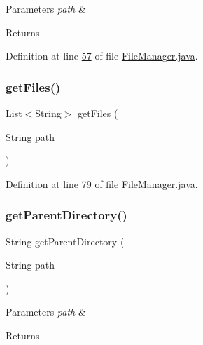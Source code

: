 \begin{DoxyParams}{Parameters}
{\em path} & \\
\hline
\end{DoxyParams}
\begin{DoxyReturn}{Returns}

\end{DoxyReturn}


Definition at line \hyperlink{_file_manager_8java_source_l00057}{57} of file \hyperlink{_file_manager_8java_source}{File\+Manager.\+java}.

\hypertarget{classfunctions_1_1_file_manager_a3a54a5574abfddd928b2b8675e8affa6}{}\label{classfunctions_1_1_file_manager_a3a54a5574abfddd928b2b8675e8affa6} 
\subsubsection{\texorpdfstring{get\+Files()}{getFiles()}}
{\footnotesize\ttfamily List$<$String$>$ get\+Files (\begin{DoxyParamCaption}\item[{String}]{path }\end{DoxyParamCaption})}



Definition at line \hyperlink{_file_manager_8java_source_l00079}{79} of file \hyperlink{_file_manager_8java_source}{File\+Manager.\+java}.

\hypertarget{classfunctions_1_1_file_manager_aa9e15d838c5a7a0e3906d9ceec253398}{}\label{classfunctions_1_1_file_manager_aa9e15d838c5a7a0e3906d9ceec253398} 
\subsubsection{\texorpdfstring{get\+Parent\+Directory()}{getParentDirectory()}}
{\footnotesize\ttfamily String get\+Parent\+Directory (\begin{DoxyParamCaption}\item[{String}]{path }\end{DoxyParamCaption})}


\begin{DoxyParams}{Parameters}
{\em path} & \\
\hline
\end{DoxyParams}
\begin{DoxyReturn}{Returns}

\end{DoxyReturn}


